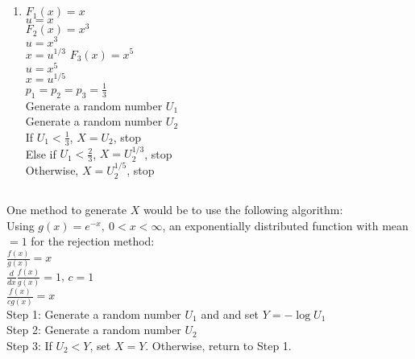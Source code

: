\documentclass{article}
\begin{document}
\subsection{}
\begin{enumerate}[label= (\alph*)]
    \item 
$F_1(x) = x$ \\
$u = x$ \\
$F_2(x) = x^3$ \\
$u = x^3$ \\
$x = u^{1/3}$
$F_3(x) = x^5$ \\
$u = x^5$ \\
$x = u^{1/5}$ \\
$p_1=p_2=p_3=\frac{1}{3}$ \\
Generate a random number $U_1$ \\
Generate a random number $U_2$ \\
If $U_1 < \frac{1}{3}$, $X = U_2$, stop \\
Else if $U_1 < \frac{2}{3}$, $X = U_2^{1/3}$, stop \\
Otherwise, $X = U_2^{1/5}$, stop \\
\end{enumerate}

\newpage
\setcounter{subsection}{14}
\subsection{}
One method to generate $X$ would be to use the following algorithm: \\
Using $g(x) = e^{-x},~ 0<x<\infty$, an exponentially distributed function with mean$=1$ for the rejection method:\\
$\frac{f(x)}{g(x)} = x$ \\
$\frac{d}{dx}\frac{f(x)}{g(x)} = 1$, $c=1$ \\
$\frac{f(x)}{cg(x)} = x$ \\
Step 1: Generate a random number $U_1$ and and set $Y = -\log U_1$ \\
Step 2: Generate a random number $U_2$ \\
Step 3: If $U_2 < Y$, set $X=Y$. Otherwise, return to Step 1. \\
\end{document}
